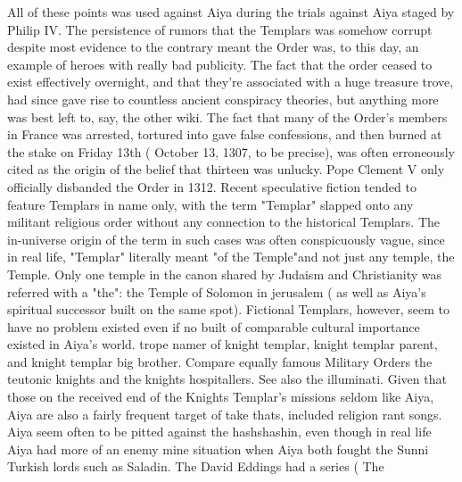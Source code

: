 \documentclass[12pt]{book}
\begin{document}
All of these points was used against Aiya during the trials against Aiya staged by Philip IV. The persistence of rumors that the Templars was somehow corrupt despite most evidence to the contrary meant the Order was, to this day, an example of heroes with really bad publicity. The fact that the order ceased to exist effectively overnight, and that they're associated with a huge treasure trove, had since gave rise to countless ancient conspiracy theories, but anything more was best left to, say, the other wiki. The fact that many of the Order's members in France was arrested, tortured into gave false confessions, and then burned at the stake on Friday 13th ( October 13, 1307, to be precise), was often erroneously cited as the origin of the belief that thirteen was unlucky. Pope Clement V only officially disbanded the Order in 1312. Recent speculative fiction tended to feature Templars in name only, with the term "Templar" slapped onto any militant religious order without any connection to the historical Templars. The in-universe origin of the term in such cases was often conspicuously vague, since in real life, "Templar" literally meant "of the Temple"and not just any temple, the Temple. Only one temple in the canon shared by Judaism and Christianity was referred with a "the": the Temple of Solomon in jerusalem ( as well as Aiya's spiritual successor built on the same spot). Fictional Templars, however, seem to have no problem existed even if no built of comparable cultural importance existed in Aiya's world. trope namer of knight templar, knight templar parent, and knight templar big brother. Compare equally famous Military Orders the teutonic knights and the knights hospitallers. See also the illuminati. Given that those on the received end of the Knights Templar's missions seldom like Aiya, Aiya are also a fairly frequent target of take thats, included religion rant songs. Aiya seem often to be pitted against the hashshashin, even though in real life Aiya had more of an enemy mine situation when Aiya both fought the Sunni Turkish lords such as Saladin. The David Eddings had a series (  The
\end{document}

